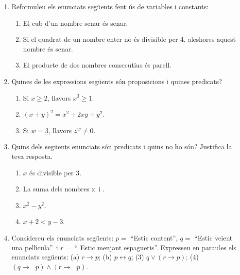 

\begin{enumerate}
\item Reformuleu els enunciats seg\"{u}ents fent \'{u}s de variables i constants:

\begin{enumerate}
\item El cub d'un nombre senar \'{e}s senar.

\item Si el quadrat de un nombre enter no \'{e}s divisible per 4, aleshores
aquest nombre \'{e}s senar.

\item El producte de dos nombres consecutius \'{e}s parell.
\end{enumerate}

\item Quines de les expressions seg\"{u}ents s\'{o}n proposicions i quines predicats?

\begin{enumerate}
\item Si $x\geq2$, llavors $x^{3}\geq1.$

\item $(x+y)^{2}=x^{2}+2xy+y^{2}$.

\item Si $w=3$, llavors $z^{w}\neq0$.
\end{enumerate}

\item Quins dels seg\"{u}ents enunciats s\'{o}n predicats i quins no ho
s\'{o}n? Justifica la teva resposta.\qquad

\begin{enumerate}
\item $x$ \'{e}s divisible per 3.

\item La suma dels nombres \thinspace x\thinspace\ i .

\item $x^{2}-y^{2}$.

\item $x+2<y-3$.
\end{enumerate}

\item Considereu els enunciats seg\"{u}ents: $p=$ \textquotedblleft Estic
content\textquotedblright, $q=$ \textquotedblleft Estic veient una
pel\textperiodcentered l\'{\i}cula\textquotedblright\ i $r=$ \textquotedblleft
Estic menjant espaguetis\textquotedblright. Expresseu en paraules els
enunciats seg\"{u}ents: (a) $r\longrightarrow p$; (b) $p\longleftrightarrow
q$; (3) $q\vee\left(  r\longrightarrow p\right)  $; (4) $\left(
q\longrightarrow\lnot p\right)  \wedge\left(  r\longrightarrow\lnot p\right)
$.


\end{enumerate}
